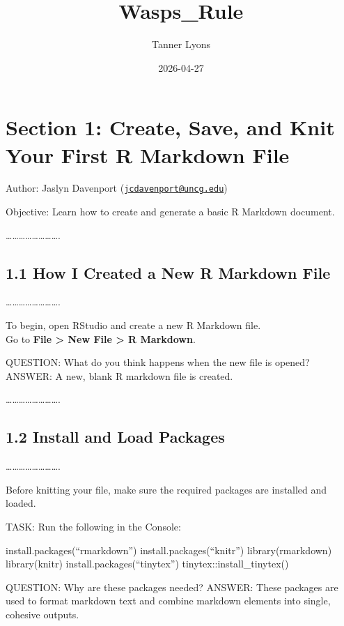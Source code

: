 \documentclass[
]{article}
\title{Wasps\_Rule}
\author{Tanner Lyons}
\date{2026-04-27}
\begin{document}
\maketitle

\section{Section 1: Create, Save, and Knit Your First R Markdown
File}\label{section-1-create-save-and-knit-your-first-r-markdown-file}

Author: Jaslyn Davenport
(\href{mailto:jcdavenport@uncg.edu}{\nolinkurl{jcdavenport@uncg.edu}})

Objective: Learn how to create and generate a basic R Markdown document.

\ldots\ldots\ldots\ldots\ldots\ldots\ldots\ldots.

\subsection{1.1 How I Created a New R Markdown
File}\label{how-i-created-a-new-r-markdown-file}

\ldots\ldots\ldots\ldots\ldots\ldots\ldots\ldots.

To begin, open RStudio and create a new R Markdown file.\\
Go to \textbf{File \textgreater{} New File \textgreater{} R Markdown}.

QUESTION: What do you think happens when the new file is opened?\\
ANSWER: A new, blank R markdown file is created.

\ldots\ldots\ldots\ldots\ldots\ldots\ldots\ldots.

\subsection{1.2 Install and Load
Packages}\label{install-and-load-packages}

\ldots\ldots\ldots\ldots\ldots\ldots\ldots\ldots.

Before knitting your file, make sure the required packages are installed
and loaded.

TASK: Run the following in the Console:

install.packages(``rmarkdown'') install.packages(``knitr'')
library(rmarkdown) library(knitr) install.packages(``tinytex'')
tinytex::install\_tinytex()

QUESTION: Why are these packages needed? ANSWER: These packages are used
to format markdown text and combine markdown elements into single,
cohesive outputs.
\end{document}

